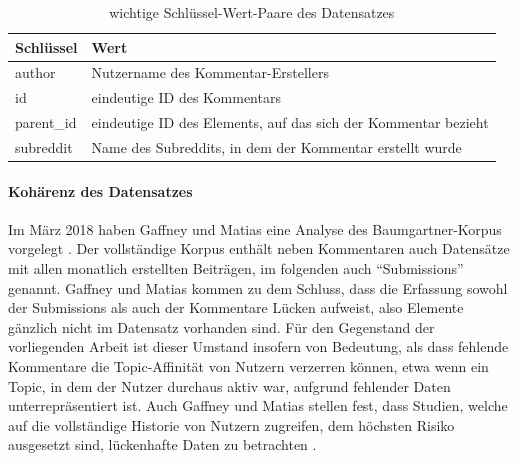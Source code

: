 \documentclass[11pt,a4paper,twoside]{article}
\let\oldpar\paragraph
\renewcommand{\paragraph}{\oldpar*}
\begin{document}
\begin{table}

\caption{\label{tab:importantkeys}wichtige Schlüssel-Wert-Paare des Datensatzes}
\centering
\begin{tabular}[t]{ll}
\toprule
Schlüssel & Wert\\
\midrule
author & Nutzername des Kommentar-Erstellers\\
id & eindeutige ID des Kommentars\\
parent\_id & eindeutige ID des Elements, auf das sich der Kommentar bezieht\\
subreddit & Name des Subreddits, in dem der Kommentar erstellt wurde\\
\bottomrule
\end{tabular}
\end{table}

\hypertarget{koharenz-des-datensatzes}{%
\paragraph{Kohärenz des Datensatzes}\label{koharenz-des-datensatzes}}

Im März 2018 haben Gaffney und Matias eine Analyse des
Baumgartner-Korpus vorgelegt \autocite{Gaffney2018}. Der vollständige
Korpus enthält neben Kommentaren auch Datensätze mit allen monatlich
erstellten Beiträgen, im folgenden auch \enquote{Submissions} genannt.
Gaffney und Matias kommen zu dem Schluss, dass die Erfassung sowohl der
Submissions als auch der Kommentare Lücken aufweist, also Elemente
gänzlich nicht im Datensatz vorhanden sind. Für den Gegenstand der
vorliegenden Arbeit ist dieser Umstand insofern von Bedeutung, als dass
fehlende Kommentare die Topic-Affinität von Nutzern verzerren können,
etwa wenn ein Topic, in dem der Nutzer durchaus aktiv war, aufgrund
fehlender Daten unterrepräsentiert ist. Auch Gaffney und Matias stellen
fest, dass Studien, welche auf die vollständige Historie von Nutzern
zugreifen, dem höchsten Risiko ausgesetzt sind, lückenhafte Daten zu
betrachten \autocite{Gaffney2018}.
\end{document}
